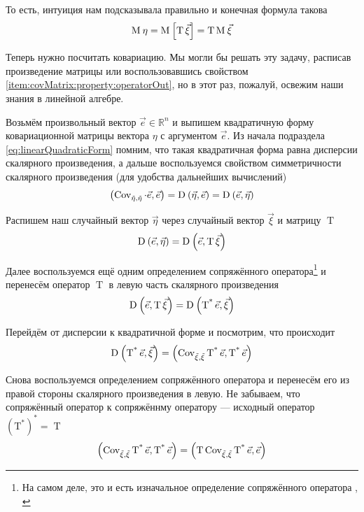 То есть, интуиция нам подсказывала правильно и конечная формула такова
$$\operatorname{M}_{} \eta
    = \operatorname{M}_{} \left[ \operatorname{T} \vec{\xi}  \right]
    = \operatorname{T} \operatorname{M}_{} \vec{\xi} $$

Теперь нужно посчитать ковариацию. Мы могли бы решать эту задачу,
расписав произведение матрицы или воспользовавшись свойством
\ref{item:covMatrix:property:operatorOut}, но в этот раз, пожалуй, освежим
наши знания в линейной алгебре.

Возьмём произвольный вектор $\vec{e} \in \mathbb{R}^n$
и выпишем квадратичную форму ковариационной матрицы вектора $\eta$
с аргументом $\vec{e}$. Из начала подраздела \eqref{eq:linearQuadraticForm}
помним, что такая квадратичная форма равна дисперсии скалярного произведения, а
дальше воспользуемся свойством симметричности скалярного произведения
(для удобства дальнейших вычислений)
$$\left( \operatorname{Cov^{}_{\vec{\eta}, \vec{\eta}}} \cdot \vec{e}, \vec{e} \right)
    = \operatorname{D}_{} \left( \vec{\eta}, \vec{e} \right)
    = \operatorname{D}_{} \left( \vec{e}, \vec{\eta} \right)$$

Распишем наш случайный вектор $\vec{\eta}$ через случайный вектор $\vec{\xi}$
и матрицу $\operatorname{T}$
$$\operatorname{D}_{} \left( \vec{e}, \vec{\eta} \right)
    = \operatorname{D}_{} \left( \vec{e}, \operatorname{T} \vec{\xi} \right)$$

Далее воспользуемся ещё одним определением сопряжённого оператора\footnote{На
самом деле, это и есть изначальное определение сопряжённого оператора
\cite[с.~241]{VoevodinLA}, \cite[с.~126]{IlinPoznyarLA}}
и перенесём оператор $\operatorname{T}$ в левую часть скалярного произведения
$$\operatorname{D}_{} \left( \vec{e}, \operatorname{T} \vec{\xi} \right)
    = \operatorname{D}_{} \left( \operatorname{T^*} \vec{e} , \vec{\xi} \right)$$

Перейдём от дисперсии к квадратичной форме и посмотрим, что происходит
$$\operatorname{D}_{} \left( \operatorname{T^*} \vec{e} , \vec{\xi} \right)
    = \left( \operatorname{\operatorname{Cov^{}_{\vec{\xi}, \vec{\xi}}}} \operatorname{T^*} \vec{e} ,
        \operatorname{T^*} \vec{e} \right)$$

Снова воспользуемся определением сопряжённого оператора и перенесём его
из правой стороны скалярного произведения в левую. Не забываем, что
сопряжённый оператор к сопряжённму оператору --- исходный оператор
$\left( \operatorname{T^*} \right)^* = \operatorname{T}$
$$\left( \operatorname{\operatorname{Cov^{}_{\vec{\xi}, \vec{\xi}}}} \operatorname{T^*} \vec{e},
        \operatorname{T^*} \vec{e} \right)
    = \left( \operatorname{T} \operatorname{\operatorname{Cov^{}_{\vec{\xi}, \vec{\xi}}}} \operatorname{T^*}
            \vec{e}, \vec{e} \right)$$

